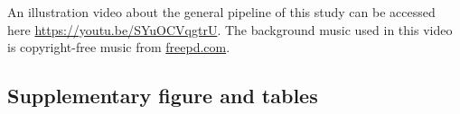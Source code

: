 An illustration video about the general pipeline of this study can be accessed here \url{https://youtu.be/SYuOCVqgtrU}. The background music used in this video is copyright-free music from \url{freepd.com}.

\subsection{Supplementary figure and tables}







\newpage

\begin{landscape}
  
\end{landscape}



